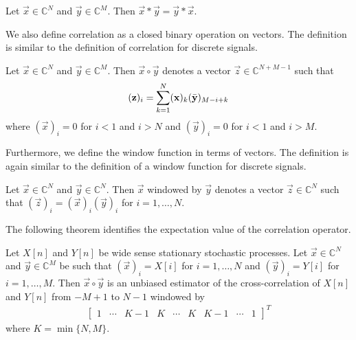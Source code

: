 \documentclass[a4paper, openany, oneside]{memoir}
\begin{document}
\begin{blockTheorem} \label{th:conv-comm}
    Let $\vec{x} \in \mathbb{C}^N$ and $\vec{y} \in \mathbb{C}^M$. Then $\vec{x} \ast \vec{y} = \vec{y} \ast \vec{x}$.
\end{blockTheorem}

We also define correlation as a closed binary operation on vectors. The definition is similar to the definition of correlation for discrete signals.

\begin{blockDefinition}
    Let $\vec{x} \in \mathbb{C}^N$ and $\vec{y} \in \mathbb{C}^M$. Then $\vec{x} \circ \vec{y}$ denotes a vector $\vec{z} \in \mathbb{C}^{N+M-1}$ such that
    \begin{align*}
        (\boldsymbol{\mathbf{z}})_i = \sum_{k=1}^{N} (\boldsymbol{\mathbf{x}})_k (\bar{\boldsymbol{\mathbf{y}}})_{M-i+k}
    \end{align*}
    where $(\vec{x})_i=0$ for $i < 1$ and $i > N$ and $(\vec{y})_i=0$ for $i < 1$ and $i > M$.
\end{blockDefinition}

Furthermore, we define the window function in terms of vectors. The definition is again similar to the definition of a window function for discrete signals.

\begin{blockDefinition}
    Let $\vec{x} \in \mathbb{C}^N$ and $\vec{y} \in \mathbb{C}^N$. Then $\vec{x}$ windowed by $\vec{y}$ denotes a vector $\vec{z} \in \mathbb{C}^N$ such that $(\vec{z})_i = (\vec{x})_i (\vec{y})_i$ for $i = 1,\ldots,N$.
\end{blockDefinition}

The following theorem identifies the expectation value of the correlation operator.

\begin{blockTheorem} \label{th:corr-unbiased}
    Let $X[n]$ and $Y[n]$ be wide sense stationary stochastic processes. Let $\vec{x} \in \mathbb{C}^N$ and $\vec{y} \in \mathbb{C}^M$ be such that $(\vec{x})_i = X[i]$ for $i=1,\ldots,N$ and $(\vec{y})_i = Y[i]$ for $i=1,\ldots,M$. Then $\vec{x} \circ \vec{y}$ is an unbiased estimator of the cross-correlation of $X[n]$ and $Y[n]$ from $-M+1$ to $N-1$ windowed by
    \begin{align*}
        \begin{bmatrix}
            1 & \cdots & K - 1 & K & \cdots &K & K - 1 & \cdots & 1
        \end{bmatrix}^T
    \end{align*}
    where $K = \min\{N,M\}$.
\end{blockTheorem}
\end{document}

